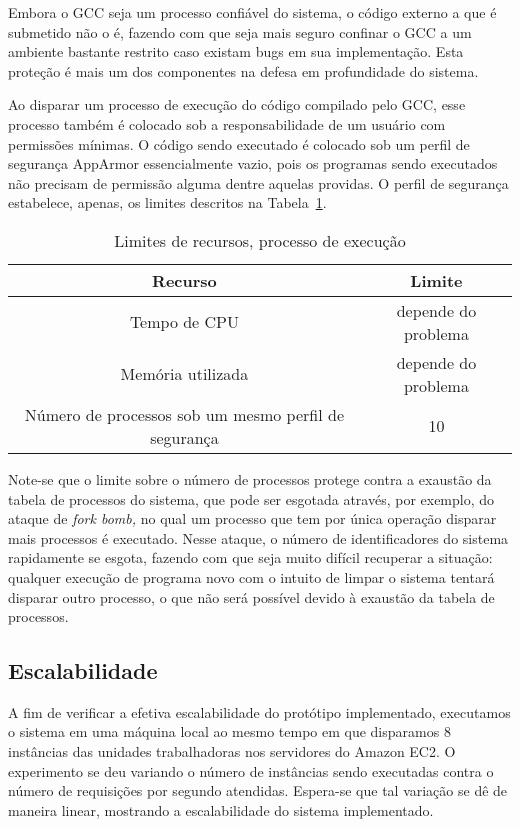 \documentclass[ruledheader, 12pt]{abnt}
\newcommand{\tblref}[1]{Tabela~\ref{tbl:#1}}
\begin{document}
Embora o GCC seja um processo confiável do sistema, o código externo a que é submetido não o é, fazendo com que seja mais seguro confinar o GCC a um ambiente bastante restrito caso existam bugs em sua implementação. Esta proteção é mais um dos componentes na defesa em profundidade do sistema.

Ao disparar um processo de execução do código compilado pelo GCC, esse processo também é colocado sob a responsabilidade de um usuário com permissões mínimas. O código sendo executado é colocado sob um perfil de segurança AppArmor essencialmente vazio, pois os programas sendo executados não precisam de permissão alguma dentre aquelas providas. O perfil de segurança estabelece, apenas, os limites descritos na \tblref{execution-limits}.

\begin{table}[h]
	\centering
	\caption{\label{tbl:execution-limits}Limites de recursos, processo de execução}
	\begin{tabular}{c c}\hline
		\hline
		Recurso & Limite \\\hline
		\hline
		Tempo de CPU & depende do problema \\\hline
		Memória utilizada & depende do problema \\\hline
		Número de processos sob um mesmo perfil de segurança & 10 \\\hline
		\hline
	\end{tabular}
\end{table}

Note-se que o limite sobre o número de processos protege contra a exaustão da tabela de processos do sistema, que pode ser esgotada através, por exemplo, do ataque de \emph{fork bomb,} no qual um processo que tem por única operação disparar mais processos é executado. Nesse ataque, o número de identificadores do sistema rapidamente se esgota, fazendo com que seja muito difícil recuperar a situação: qualquer execução de programa novo com o intuito de limpar o sistema tentará disparar outro processo, o que não será possível devido à exaustão da tabela de processos.

\subsection{Escalabilidade}

A fim de verificar a efetiva escalabilidade do protótipo implementado, executamos o sistema em uma máquina local ao mesmo tempo em que disparamos 8 instâncias das unidades trabalhadoras nos servidores do Amazon EC2. O experimento se deu variando o número de instâncias sendo executadas contra o número de requisições por segundo atendidas. Espera-se que tal variação se dê de maneira linear, mostrando a escalabilidade do sistema implementado.
\end{document}
